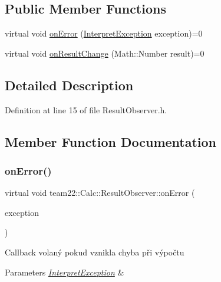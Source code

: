 \subsection*{Public Member Functions}
\begin{DoxyCompactItemize}
\item 
virtual void \hyperlink{classteam22_1_1_calc_1_1_result_observer_ad36cf8df89853d60f91094800c01d329}{on\+Error} (\hyperlink{class_interpret_exception}{Interpret\+Exception} exception)=0
\item 
virtual void \hyperlink{classteam22_1_1_calc_1_1_result_observer_aa04007df3aa8a499c3a511f549238285}{on\+Result\+Change} (Math\+::\+Number result)=0
\end{DoxyCompactItemize}


\subsection{Detailed Description}


Definition at line 15 of file Result\+Observer.\+h.



\subsection{Member Function Documentation}
\mbox{\label{classteam22_1_1_calc_1_1_result_observer_ad36cf8df89853d60f91094800c01d329}} 
\subsubsection{\texorpdfstring{on\+Error()}{onError()}}
{\footnotesize\ttfamily virtual void team22\+::\+Calc\+::\+Result\+Observer\+::on\+Error (\begin{DoxyParamCaption}\item[{\hyperlink{class_interpret_exception}{Interpret\+Exception}}]{exception }\end{DoxyParamCaption})\hspace{0.3cm}{\ttfamily [pure virtual]}}

Callback volaný pokud vznikla chyba při výpočtu 
\begin{DoxyParams}{Parameters}
{\em \hyperlink{class_interpret_exception}{Interpret\+Exception}} & \\
\hline
\end{DoxyParams}



